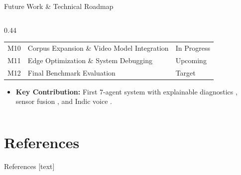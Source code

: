 \documentclass[aspectratio=169, 10pt]{beamer}
\begin{document}
\begin{frame}{Future Work \& Technical Roadmap}
\begin{columns}[T]
\begin{column}{0.44\textwidth}
{\begin{tabular}{lll}
                    M10 & Corpus Expansion \& Video Model Integration & In Progress \\
                    M11 & Edge Optimization \& System Debugging \cite{onnx2019} & Upcoming \\
                    M12 & Final Benchmark Evaluation \cite{ragas2023,mirage2025} & Target \\
                    \bottomrule
                \end{tabular}
            }
            \begin{itemize}\small\setlength{\itemsep}{1pt}
                \item \textbf{Key Contribution:} First 7-agent system with explainable diagnostics \cite{gradcam2017,shap2017}, sensor fusion \cite{cropibot2026}, and Indic voice \cite{indicAsr2025,bhashini2023}.
            \end{itemize}
        \end{column}
    \end{columns}
\end{frame}

\section{References}
\begin{frame}[allowframebreaks]{References}
    \tiny
    [text]
    
    
    \let\oldthebibliography\thebibliography
    \let\endoldthebibliography\endthebibliography
    \renewenvironment{thebibliography}[1]{%
        \begin{oldthebibliography}{#1}%
        \setlength{\itemsep}{0pt}%
        \setlength{\parsep}{0pt}%
    }{%
        \end{oldthebibliography}%
    }
    
    
\end{frame}
\end{document}
